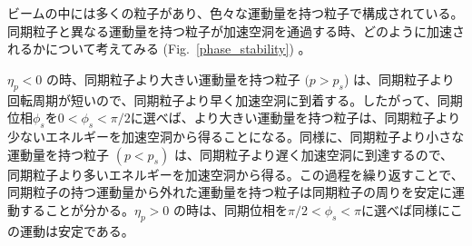 \documentclass[10pt,a4paper]{ltjsarticle}
\begin{document}
ビームの中には多くの粒子があり、色々な運動量を持つ粒子で構成されている。同期粒子と異なる運動量を持つ粒子が加速空洞を通過する時、どのように加速されるかについて考えてみる (Fig.~\ref{phase_stability}) 。

$\eta_p < 0$ の時、同期粒子より大きい運動量を持つ粒子 $(p>p_s$) は、同期粒子より回転周期が短いので、同期粒子より早く加速空洞に到着する。したがって、同期位相$\phi_s$を$0<\phi_s<\pi/2$に選べば、より大きい運動量を持つ粒子は、同期粒子より少ないエネルギーを加速空洞から得ることになる。同様に、同期粒子より小さな運動量を持つ粒子 $(p<p_s)$ は、同期粒子より遅く加速空洞に到達するので、同期粒子より多いエネルギーを加速空洞から得る。この過程を繰り返すことで、同期粒子の持つ運動量から外れた運動量を持つ粒子は同期粒子の周りを安定に運動することが分かる。$\eta_p > 0$ の時は、同期位相を$\pi/2<\phi_s<\pi$に選べば同様にこの運動は安定である。
\end{document}
